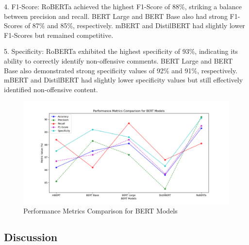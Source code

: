 \documentclass{svproc}
\begin{document}
4. F1-Score: RoBERTa achieved the highest F1-Score of 88\%, striking a balance between precision and recall. BERT Large and BERT Base also had strong F1-Scores of 87\% and 85\%, respectively. mBERT and DistilBERT had slightly lower F1-Scores but remained competitive.

5. Specificity: RoBERTa exhibited the highest specificity of 93\%, indicating its ability to correctly identify non-offensive comments. BERT Large and BERT Base also demonstrated strong specificity values of 92\% and 91\%, respectively. mBERT and DistilBERT had slightly lower specificity values but still effectively identified non-offensive content.

\begin{figure}[h]
\centering
\includegraphics[width=1.1\linewidth]{Figures/performance_metrics.png}
\caption{Performance Metrics Comparison for BERT Models}
\label{fig:performance-metrics}
\end{figure}

\subsection{Discussion}
\end{document}
